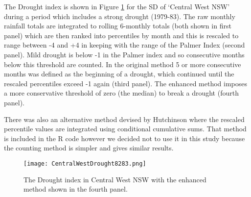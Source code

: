 \documentclass[a4paper]{article}                %
\begin{document}
        The Drought index is shown in Figure \ref{fig:CentralWestDrought8283.png} for the SD of `Central West NSW' during a period which includes a strong drought (1979-83). The raw monthly rainfall totals are integrated to rolling 6-monthly totals (both shown in first panel) which are then ranked into percentiles by month and this is rescaled to range between -4 and +4 in keeping with the range of the Palmer Index \cite{Palmer1965} (second panel).  Mild drought is below -1 in the Palmer index and so consecutive months below this threshold are counted. In the original method 5 or more consecutive months was defined as the beginning of a drought, which continued until the rescaled percentiles exceed -1 again  (third panel).  The enhanced method imposes a more conservative threshold of zero (the median) to break a drought (fourth panel).

        There was also an alternative method devised by Hutchinson where the rescaled percentile values are integrated using conditional cumulative sums.  That method is included in the R code however we decided not to use it in this study because the counting method is simpler and gives similar results.

        \begin{figure}[!h]
        \centering
        \texttt{[image: CentralWestDrought8283.png]}
        \caption{The Drought index in Central West NSW with the enhanced method shown in the fourth panel.}
        \label{fig:CentralWestDrought8283.png}
        \end{figure}







\end{document}
